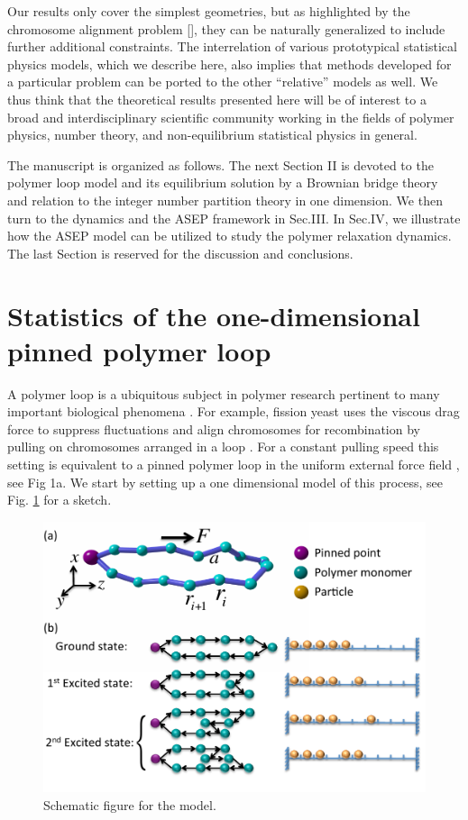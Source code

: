 \documentclass[aps,showpacs,twocolumn,floatfix,prx,superscriptaddress]{revtex4-1}
\begin{document}
Our results only cover the simplest geometries, but as highlighted by the chromosome alignment problem [], they can be naturally generalized to include further additional constraints. The interrelation of various prototypical statistical physics models, which we describe here, also implies that methods developed for a particular problem can be ported to the other ``relative'' models as well. We thus think that the theoretical results presented here will be of interest to a broad and interdisciplinary scientific community working in the fields of polymer physics, number theory, and non-equilibrium statistical physics in general. 

The manuscript is organized as follows. The next Section II is devoted to the polymer loop model and its equilibrium solution by a Brownian bridge theory and relation to the integer number partition theory in one dimension. We then turn to the dynamics and the ASEP framework in Sec.III. In Sec.IV, we illustrate how the ASEP model can be utilized to study the polymer relaxation dynamics. The last Section is reserved for the discussion and conclusions.

\section{Statistics of the one-dimensional pinned polymer loop}
A polymer loop is a ubiquitous subject in polymer research pertinent to many
important biological phenomena \cite{}. For example, fission yeast uses the
viscous drag force to suppress fluctuations and align chromosomes for
recombination by pulling on chromosomes arranged in a loop \cite{}. For a constant
pulling speed this setting is equivalent to a pinned polymer loop in the uniform
external force field \cite{}, see Fig 1a. We start by setting up a one dimensional model of
this process, see Fig. \ref{fig:schematic} for a sketch. 
\begin{figure}[htpb]
    \centering
    \includegraphics[width=1.0\linewidth]{schematic}
    \caption{Schematic figure for the model.}
    \label{fig:schematic}
\end{figure}
\end{document}
